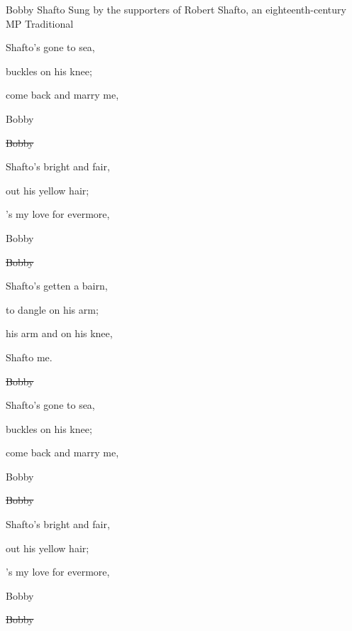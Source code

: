 \begin{SBSong}{Bobby Shafto}
  {Sung by the supporters of Robert Shafto, an eighteenth-century MP}
  {Traditional}
  \begin{SBVerse}
	 Shafto's gone to sea,

	 buckles on his knee;

	 come back and marry me,

	 Bobby 

	\sout{ Bobby }
  \end{SBVerse}
  \begin{SBVerse}
	 Shafto's bright and fair,

	 out his yellow hair;

	's my love for evermore,

	 Bobby 

	\sout{ Bobby }
  \end{SBVerse}
  \begin{SBVerse}
	 Shafto's getten a bairn,

	 to dangle on his arm;

	 his arm and on his knee,

	 Shafto  me.

	\sout{ Bobby }
  \end{SBVerse}
   \begin{SBVerse}
	 Shafto's gone to sea,

	 buckles on his knee;

	 come back and marry me,

	 Bobby 

	\sout{ Bobby }
  \end{SBVerse}
  \begin{SBVerse}
	 Shafto's bright and fair,

	 out his yellow hair;

	's my love for evermore,

	 Bobby 

	\sout{ Bobby }
  \end{SBVerse}
\end{SBSong}
